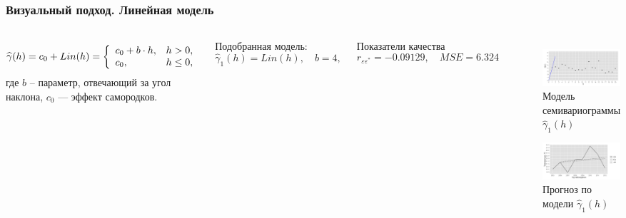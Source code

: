 \documentclass[10pt,pdf,aspectratio=169,hyperref={unicode}]{beamer}
\begin{document}
\begin{frame}
  \frametitle{Визуальный подход. \small{Линейная модель}}
  \begin{columns}[c]
  \column{3in}
  \begin{equation}\begin{gathered}
  \label{eq:lin}
    \widehat{\gamma}(h) = c_0 + Lin(h) = \left\{
   \begin{array}{l l}
     c_0 + b \cdot h, & h > 0, \\
     c_0, & h \leq 0,
   \end{array} \right.
  \end{gathered}\end{equation}
  где $ b $ -- параметр, отвечающий за угол наклона, $ c_0 $ --- эффект самородков.

  \vspace{0.5em}

  Подобранная модель:
  \begin{equation}
  \label{eq:gamma1}
    \widehat{\gamma}_1(h) = Lin(h), \quad b = 4,
  \end{equation}

  Показатели качества
  \begin{equation*}
    r_{\varepsilon\varepsilon^{*}} = -0.09129, \quad MSE = 6.324
  \end{equation*}

  \column{3in}
  \vspace{-14.5pt}
  \begin{figure}[H]
    \includegraphics[width=0.9\linewidth]{../../figures/variogram/lin-modeled.png} \\
    \caption{Модель семивариограммы $\widehat{\gamma}_1(h)$}
    \includegraphics[width=0.9\linewidth]{../../figures/variogram/lin-cross-prediction.png}
    \caption{Прогноз по модели $\widehat{\gamma}_1(h)$}
  \end{figure}
  \end{columns}
\end{frame}
\end{document}
